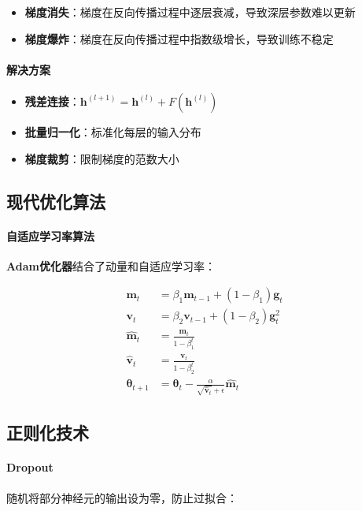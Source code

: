 \begin{itemize}
\item \textbf{梯度消失}：梯度在反向传播过程中逐层衰减，导致深层参数难以更新
\item \textbf{梯度爆炸}：梯度在反向传播过程中指数级增长，导致训练不稳定
\end{itemize}

\paragraph{解决方案}
\begin{itemize}
\item \textbf{残差连接}：$\mathbf{h}^{(l+1)} = \mathbf{h}^{(l)} + F(\mathbf{h}^{(l)})$
\item \textbf{批量归一化}：标准化每层的输入分布
\item \textbf{梯度裁剪}：限制梯度的范数大小
\end{itemize}

\subsection{现代优化算法}

\paragraph{自适应学习率算法}

\textbf{Adam优化器}结合了动量和自适应学习率：

\begin{align}
\mathbf{m}_t &= \beta_1 \mathbf{m}_{t-1} + (1-\beta_1) \mathbf{g}_t \\
\mathbf{v}_t &= \beta_2 \mathbf{v}_{t-1} + (1-\beta_2) \mathbf{g}_t^2 \\
\hat{\mathbf{m}}_t &= \frac{\mathbf{m}_t}{1-\beta_1^t} \\
\hat{\mathbf{v}}_t &= \frac{\mathbf{v}_t}{1-\beta_2^t} \\
\boldsymbol{\theta}_{t+1} &= \boldsymbol{\theta}_t - \frac{\alpha}{\sqrt{\hat{\mathbf{v}}_t} + \epsilon} \hat{\mathbf{m}}_t
\end{align}

\subsection{正则化技术}

\paragraph{Dropout}
随机将部分神经元的输出设为零，防止过拟合：

